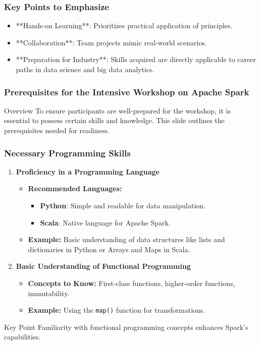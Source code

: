 \documentclass[aspectratio=169]{beamer}
\begin{document}
\begin{frame}[fragile]
    \frametitle{Key Points to Emphasize}
    \begin{itemize}
        \item **Hands-on Learning**: Prioritizes practical application of principles.
        \item **Collaboration**: Team projects mimic real-world scenarios.
        \item **Preparation for Industry**: Skills acquired are directly applicable to career paths in data science and big data analytics.
    \end{itemize}
\end{frame}

\begin{frame}[fragile]
    \frametitle{Prerequisites for the Intensive Workshop on Apache Spark}
    \begin{block}{Overview}
        To ensure participants are well-prepared for the workshop, it is essential to possess certain skills and knowledge. This slide outlines the prerequisites needed for readiness.
    \end{block}
\end{frame}

\begin{frame}[fragile]
    \frametitle{Necessary Programming Skills}
    \begin{enumerate}
        \item \textbf{Proficiency in a Programming Language}
            \begin{itemize}
                \item \textbf{Recommended Languages:}
                \begin{itemize}
                    \item \textbf{Python}: Simple and readable for data manipulation.
                    \item \textbf{Scala}: Native language for Apache Spark.
                \end{itemize}
                \item \textbf{Example:} Basic understanding of data structures like lists and dictionaries in Python or Arrays and Maps in Scala.
            \end{itemize}
        
        \item \textbf{Basic Understanding of Functional Programming}
            \begin{itemize}
                \item \textbf{Concepts to Know:} First-class functions, higher-order functions, immutability.
                \item \textbf{Example:} Using the \texttt{map()} function for transformations.
            \end{itemize}
    \end{enumerate}
    \begin{block}{Key Point}
        Familiarity with functional programming concepts enhances Spark's capabilities.
    \end{block}
\end{frame}
\end{document}
